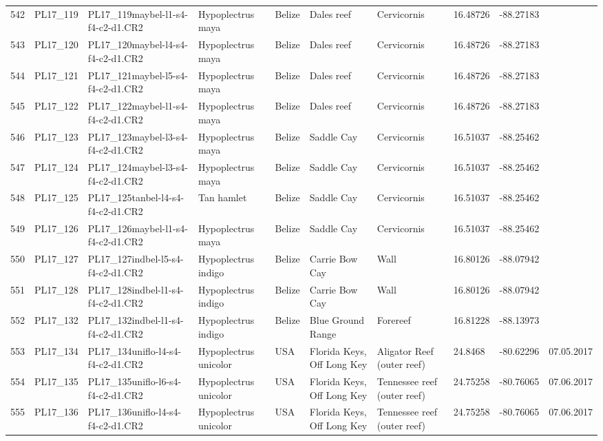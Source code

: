 \begin{table}[ht]
\begin{tabular}{rlllllllll}
  542 & PL17\_119 & PL17\_119maybel-l1-s4-f4-c2-d1.CR2 & Hypoplectrus maya & Belize & Dales reef & Cervicornis & 16.48726 & -88.27183 &  \\ 
  543 & PL17\_120 & PL17\_120maybel-l4-s4-f4-c2-d1.CR2 & Hypoplectrus maya & Belize & Dales reef & Cervicornis & 16.48726 & -88.27183 &  \\ 
  544 & PL17\_121 & PL17\_121maybel-l5-s4-f4-c2-d1.CR2 & Hypoplectrus maya & Belize & Dales reef & Cervicornis & 16.48726 & -88.27183 &  \\ 
  545 & PL17\_122 & PL17\_122maybel-l1-s4-f4-c2-d1.CR2 & Hypoplectrus maya & Belize & Dales reef & Cervicornis & 16.48726 & -88.27183 &  \\ 
  546 & PL17\_123 & PL17\_123maybel-l3-s4-f4-c2-d1.CR2 & Hypoplectrus maya & Belize & Saddle Cay & Cervicornis & 16.51037 & -88.25462 &  \\ 
  547 & PL17\_124 & PL17\_124maybel-l3-s4-f4-c2-d1.CR2 & Hypoplectrus maya & Belize & Saddle Cay & Cervicornis & 16.51037 & -88.25462 &  \\ 
  548 & PL17\_125 & PL17\_125tanbel-l4-s4-f4-c2-d1.CR2 & Tan hamlet & Belize & Saddle Cay & Cervicornis & 16.51037 & -88.25462 &  \\ 
  549 & PL17\_126 & PL17\_126maybel-l1-s4-f4-c2-d1.CR2 & Hypoplectrus maya & Belize & Saddle Cay & Cervicornis & 16.51037 & -88.25462 &  \\ 
  550 & PL17\_127 & PL17\_127indbel-l5-s4-f4-c2-d1.CR2 & Hypoplectrus indigo & Belize & Carrie Bow Cay & Wall & 16.80126 & -88.07942 &  \\ 
  551 & PL17\_128 & PL17\_128indbel-l1-s4-f4-c2-d1.CR2 & Hypoplectrus indigo & Belize & Carrie Bow Cay & Wall & 16.80126 & -88.07942 &  \\ 
  552 & PL17\_132 & PL17\_132indbel-l1-s4-f4-c2-d1.CR2 & Hypoplectrus indigo & Belize & Blue Ground Range & Forereef & 16.81228 & -88.13973 &  \\ 
  553 & PL17\_134 & PL17\_134uniflo-l4-s4-f4-c2-d1.CR2 & Hypoplectrus unicolor & USA & Florida Keys, Off Long Key & Aligator Reef (outer reef) & 24.8468 & -80.62296 & 07.05.2017 \\ 
  554 & PL17\_135 & PL17\_135uniflo-l6-s4-f4-c2-d1.CR2 & Hypoplectrus unicolor & USA & Florida Keys, Off Long Key & Tennessee reef (outer reef) & 24.75258 & -80.76065 & 07.06.2017 \\ 
  555 & PL17\_136 & PL17\_136uniflo-l4-s4-f4-c2-d1.CR2 & Hypoplectrus unicolor & USA & Florida Keys, Off Long Key & Tennessee reef (outer reef) & 24.75258 & -80.76065 & 07.06.2017 \\ 

\end{tabular}
\end{table}
